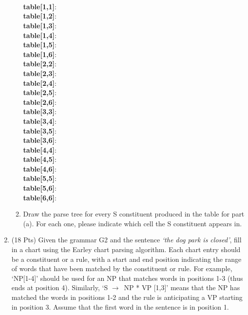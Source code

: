 \documentclass[11pt]{article}
\newcommand{\ra}{$\rightarrow$~}
\begin{document}
\begin{enumerate}
\begin{enumerate}
{{}
}
\\\\\\

\textbf{table[1,1]}: \\
\textbf{table[1,2]}: \\
\textbf{table[1,3]}: \\
\textbf{table[1,4]}: \\
\textbf{table[1,5]}: \\
\textbf{table[1,6]}: \\
\textbf{table[2,2]}: \\
\textbf{table[2,3]}: \\
\textbf{table[2,4]}: \\
\textbf{table[2,5]}: \\
\textbf{table[2,6]}: \\
\textbf{table[3,3]}: \\
\textbf{table[3,4]}: \\
\textbf{table[3,5]}: \\
\textbf{table[3,6]}: \\
\textbf{table[4,4]}: \\
\textbf{table[4,5]}: \\
\textbf{table[4,6]}: \\
\textbf{table[5,5]}: \\
\textbf{table[5,6]}: \\
\textbf{table[6,6]}: \\


\newpage

\item Draw the parse tree for every S constituent produced in the
  table for part (a). For each one, please indicate which cell the S constituent appears in.

\vspace{3in}


\end{enumerate}


\newpage

\item (18 Pts) Given the grammar G2 and the sentence {\it `the dog park is
  closed'}, fill in a chart using the Earley chart parsing
  algorithm. Each chart entry should be a constituent or a rule, with
  a start and end position indicating the range of words that have
  been matched by the constituent or rule. For example, `NP[1-4]'
  should be used for an NP that matches words in positions 1-3 (thus ends at
  position 4). Similarly, `S \ra NP * VP
  [1,3]' means that the NP has matched the words in positions
  1-2 and the rule is  anticipating a VP starting in position
  3. Assume that the first word in the   sentence is in position 1.


\end{enumerate}
\end{document}
